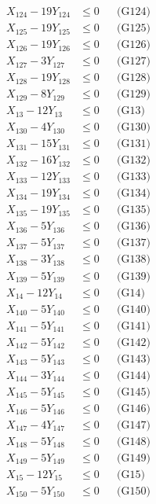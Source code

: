 \documentclass[a4paper,10pt]{article}
\begin{document}
{\begin{align}
X_{124} - 19Y_{124} &\leq 0 && \text{(G124)} \\
X_{125} - 19Y_{125} &\leq 0 && \text{(G125)} \\
X_{126} - 19Y_{126} &\leq 0 && \text{(G126)} \\
X_{127} - 3Y_{127} &\leq 0 && \text{(G127)} \\
X_{128} - 19Y_{128} &\leq 0 && \text{(G128)} \\
X_{129} - 8Y_{129} &\leq 0 && \text{(G129)} \\
X_{13} - 12Y_{13} &\leq 0 && \text{(G13)} \\
X_{130} - 4Y_{130} &\leq 0 && \text{(G130)} \\
X_{131} - 15Y_{131} &\leq 0 && \text{(G131)} \\
X_{132} - 16Y_{132} &\leq 0 && \text{(G132)} \\
X_{133} - 12Y_{133} &\leq 0 && \text{(G133)} \\
\allowbreak
X_{134} - 19Y_{134} &\leq 0 && \text{(G134)} \\
X_{135} - 19Y_{135} &\leq 0 && \text{(G135)} \\
X_{136} - 5Y_{136} &\leq 0 && \text{(G136)} \\
X_{137} - 5Y_{137} &\leq 0 && \text{(G137)} \\
X_{138} - 3Y_{138} &\leq 0 && \text{(G138)} \\
X_{139} - 5Y_{139} &\leq 0 && \text{(G139)} \\
X_{14} - 12Y_{14} &\leq 0 && \text{(G14)} \\
X_{140} - 5Y_{140} &\leq 0 && \text{(G140)} \\
X_{141} - 5Y_{141} &\leq 0 && \text{(G141)} \\
X_{142} - 5Y_{142} &\leq 0 && \text{(G142)} \\
X_{143} - 5Y_{143} &\leq 0 && \text{(G143)} \\
X_{144} - 3Y_{144} &\leq 0 && \text{(G144)} \\
X_{145} - 5Y_{145} &\leq 0 && \text{(G145)} \\
X_{146} - 5Y_{146} &\leq 0 && \text{(G146)} \\
X_{147} - 4Y_{147} &\leq 0 && \text{(G147)} \\
X_{148} - 5Y_{148} &\leq 0 && \text{(G148)} \\
X_{149} - 5Y_{149} &\leq 0 && \text{(G149)} \\
X_{15} - 12Y_{15} &\leq 0 && \text{(G15)} \\
X_{150} - 5Y_{150} &\leq 0 && \text{(G150)} \\

\end{align}}
\end{document}
